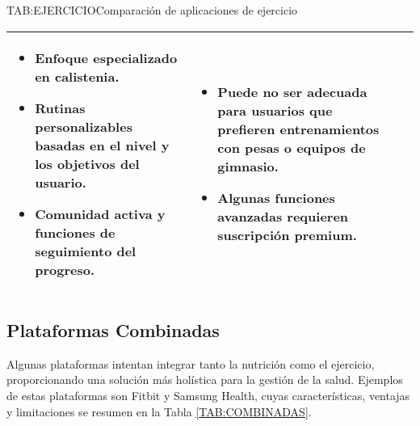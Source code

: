 \begin{table}[Comparación de aplicaciones de ejercicio]{TAB:EJERCICIO}{Comparación de aplicaciones de ejercicio}
\begin{tabular}{|p{3cm}|p{5cm}|p{5cm}|}
\begin{itemize}
      \item Enfoque especializado en calistenia.
      \item Rutinas personalizables basadas en el nivel y los objetivos del usuario.
      \item Comunidad activa y funciones de seguimiento del progreso.
    \end{itemize} & \begin{itemize}
      \item Puede no ser adecuada para usuarios que prefieren entrenamientos con pesas o equipos de gimnasio.
      \item Algunas funciones avanzadas requieren suscripción premium.
    \end{itemize} \\
    \hline
  \end{tabular}
\end{table}

\subsection{Plataformas Combinadas}

Algunas plataformas intentan integrar tanto la nutrición como el ejercicio, proporcionando una solución más holística para la gestión de la salud. Ejemplos de estas plataformas son Fitbit y Samsung Health, cuyas características, ventajas y limitaciones se resumen en la Tabla \ref{TAB:COMBINADAS}.

